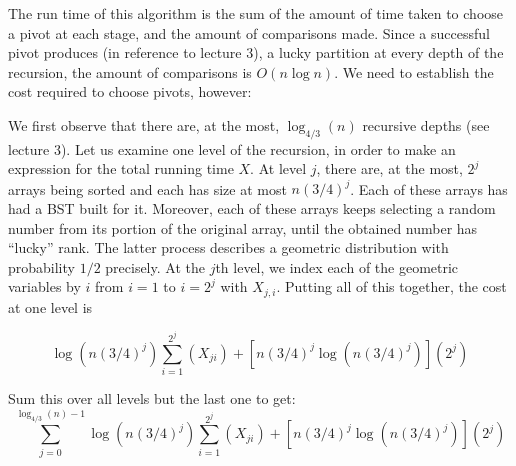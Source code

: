 \documentclass[../main.tex]{subfiles}
\begin{document}
The run time of this algorithm is the sum of the amount of time taken to choose a pivot at each stage, and the amount of comparisons made. Since a successful pivot produces (in reference to lecture 3), a lucky partition at every depth of the recursion, the amount of comparisons is $O(n \log n)$. We need to establish the cost required to choose pivots, however:

We first observe that there are, at the most, $\log_{4/3}(n)$ recursive depths (see lecture 3). Let us examine one level of the recursion, in order to make an expression for the total running time $X$. At level $j$, there are, at the most, $2^j$ arrays being sorted and each has size at most $n(3/4)^j$. Each of these arrays has had a BST built for it. Moreover, each of these arrays keeps selecting a random number from its portion of the original array, until the obtained number has ``lucky'' rank. The latter process describes a geometric distribution with probability $1/2$ precisely. At the $j$th level, we index each of the geometric variables by $i$ from $i=1$ to $i=2^j$ with $X_{j,i}$. Putting all of this together, the cost at one level is

\[
    \log(n (3/4)^j) \sum_{i=1}^{2^j}(X_{ji}) + \left[ n(3/4)^j \log\left( n(3/4)^j \right) \right](2^j)
\]

Sum this over all levels but the last one to get:
\[
    \sum_{j=0}^{\log_{4/3}(n) - 1}\log(n (3/4)^j) \sum_{i=1}^{2^j}(X_{ji}) + \left[ n(3/4)^j \log\left( n(3/4)^j \right) \right](2^j)
\]





%
%
\end{document}
